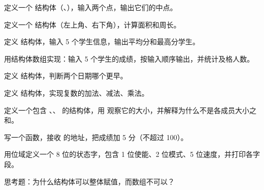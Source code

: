 \begin{problemset}
  \item 定义一个  结构体（、），输入两个点，输出它们的中点。
  \item 定义一个  结构体（左上角、右下角），计算面积和周长。
  \item 定义  结构体，输入 5 个学生信息，输出平均分和最高分学生。
  \item 用结构体数组实现：输入 5 个学生的成绩，按输入顺序输出，并统计及格人数。
  \item 定义  结构体，判断两个日期哪个更早。
  \item 定义  结构体，实现复数的加法、减法、乘法。
  \item 定义一个包含 、、 的结构体，用  观察它的大小，并解释为什么不是各成员大小之和。
  \item 写一个函数，接收  的地址，把成绩加 5 分（不超过 100）。
  \item 用位域定义一个 8 位的状态字，包含 1 位使能、2 位模式、5 位速度，并打印各字段。
  \item 思考题：为什么结构体可以整体赋值，而数组不可以？
\end{problemset}
